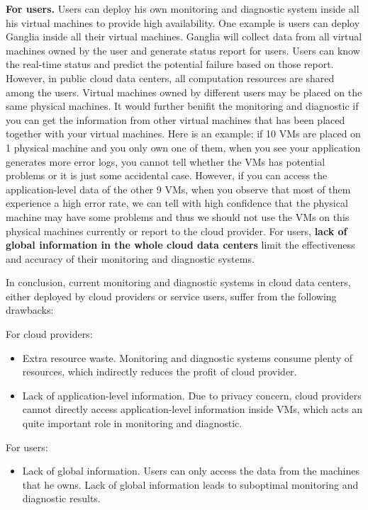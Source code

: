 \documentclass{article}
\begin{document}
\textbf{For users.}
Users can deploy his own monitoring and diagnostic system inside all his virtual machines to provide high availability. One example is users can deploy Ganglia\cite{url/ganglia} inside all their virtual machines. Ganglia will collect data from all virtual machines owned by the user and generate status report for users. Users can know the real-time status and predict the potential failure based on those report. However, in public cloud data centers, all computation resources are shared among the users. Virtual machines owned by different users may be placed on the same physical machines\cite{}. It would further benifit the monitoring and diagnostic if you can get the information from other virtual machines that has been placed together with your virtual machines. Here is an example: if 10 VMs are placed on 1 physical machine and you only own one of them, when you see your application generates more error logs, you cannot tell whether the VMs has potential problems or it is just some accidental case. However, if you can access the application-level data of the other 9 VMs, when you observe that most of them experience a high error rate, we can tell with high confidence that the physical machine may have some problems and thus we should not use the VMs on this physical machines currently or report to the cloud provider. For users, \textbf{lack of global information in the whole cloud data centers} limit the effectiveness and accuracy of their monitoring and diagnostic systems.

In conclusion, current monitoring and diagnostic systems in cloud data centers, either deployed by cloud providers or service users, suffer from the following drawbacks:

For cloud providers:
\begin{itemize}
	\item Extra resource waste. Monitoring and diagnostic systems consume plenty of resources, which indirectly reduces the profit of cloud provider.
	\item Lack of application-level information. Due to privacy concern, cloud providers cannot directly access application-level information inside VMs, which acts an quite important role in monitoring and diagnostic.
\end{itemize}

For users:
\begin{itemize}
	\item Lack of global information. Users can only access the data from the machines that he owns. Lack of global information leads to suboptimal monitoring and diagnostic results.
\end{itemize}
\end{document}
